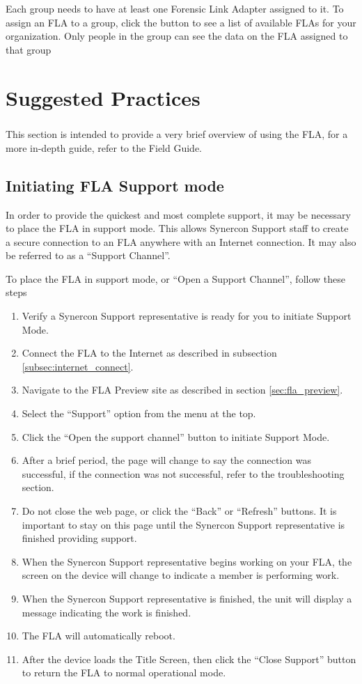 \documentclass[11pt, oneside]{book}
\begin{document}
Each group needs to have at least one Forensic Link Adapter assigned
to it. To assign an FLA to a group, click the button to see a list
of available FLAs for your organization. Only people in the group
can see the data on the FLA assigned to that group


\chapter{Suggested Practices}
\paragraph{  }
This section is intended to provide a very brief overview of using
the FLA, for a more in-depth guide, refer to the Field Guide.


\section{Initiating FLA Support mode}

In order to provide the quickest and most complete support, it may
be necessary to place the FLA in support mode. This allows Synercon
Support staff to create a secure connection to an FLA anywhere with
an Internet connection. It may also be referred to as a ``Support
Channel''.

To place the FLA in support mode, or ``Open a Support Channel'',
follow these steps
\begin{enumerate}
\item Verify a Synercon Support representative is ready for you to initiate
Support Mode.
\item Connect the FLA to the Internet as described in subsection \ref{subsec:internet_connect}.
\item Navigate to the FLA Preview site as described in section \ref{sec:fla_preview}.
\item Select the ``Support'' option from the menu at the top.
\item Click the ``Open the support channel'' button to initiate Support
Mode.
\item After a brief period, the page will change to say the connection was
successful, if the connection was not successful, refer to the troubleshooting
section.
\item Do not close the web page, or click the ``Back'' or ``Refresh''
buttons. It is important to stay on this page until the Synercon Support
representative is finished providing support.
\item When the Synercon Support representative begins working on your FLA,
the screen on the device will change to indicate a member is performing
work.
\item When the Synercon Support representative is finished, the unit will
display a message indicating the work is finished.
\item The FLA will automatically reboot.
\item After the device loads the Title Screen, then click the ``Close Support''
button to return the FLA to normal operational mode.
\end{enumerate}
\end{document}
